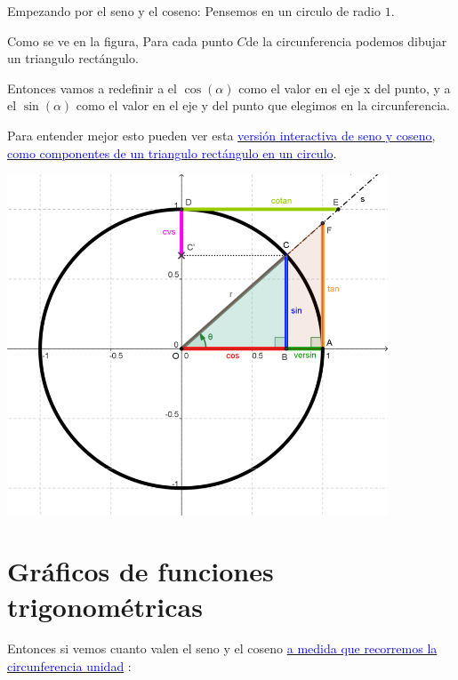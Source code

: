 \documentclass[a4paper,11pt,spanish,sans]{exam}
\begin{document}
Empezando por el seno y el coseno: Pensemos en un circulo de radio $1$.

\begin{minipage}{0.45\linewidth}
	Como se ve en la figura, Para cada punto \textquotesingle$C$\textquotesingle de la circunferencia podemos dibujar un triangulo rectángulo.
	
	Entonces vamos a redefinir a el $\cos(\alpha)$ como el valor en el eje x del punto, y a el $\sin(\alpha)$ como el valor en el eje y del punto que elegimos en la circunferencia.  
	
	Para entender mejor esto pueden ver esta \href{http://tube.geogebra.org/m/960}{\textcolor{blue}{versión interactiva de seno y coseno, como componentes de un triangulo rectángulo en un circulo}}.

\end{minipage}
\begin{minipage}{0.55\linewidth}
	\includegraphics[width=0.85\textwidth]{trigocirc.png}
\end{minipage}

\section*{Gráficos de funciones trigonométricas}


Entonces si vemos cuanto valen el seno y el coseno \href{http://tube.geogebra.org/material/simple/id/311963}{\textcolor{blue}{a medida que recorremos la circunferencia unidad}} :
\end{document}
